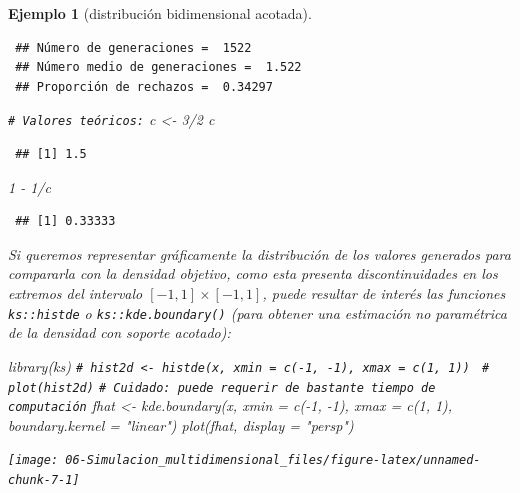 \documentclass[
  10pt,
]{book}
\newenvironment{Shaded}{\begin{snugshade}}{\end{snugshade}}
\newcommand{\AttributeTok}[1]{\textcolor[rgb]{0.77,0.63,0.00}{#1}}
\newcommand{\CommentTok}[1]{\textcolor[rgb]{0.56,0.35,0.01}{\textit{#1}}}
\newcommand{\DecValTok}[1]{\textcolor[rgb]{0.00,0.00,0.81}{#1}}
\newcommand{\FunctionTok}[1]{\textcolor[rgb]{0.00,0.00,0.00}{#1}}
\newcommand{\NormalTok}[1]{#1}
\newcommand{\OtherTok}[1]{\textcolor[rgb]{0.56,0.35,0.01}{#1}}
\newcommand{\SpecialCharTok}[1]{\textcolor[rgb]{0.00,0.00,0.00}{#1}}
\newcommand{\StringTok}[1]{\textcolor[rgb]{0.31,0.60,0.02}{#1}}
\theoremstyle{break}
\newtheorem{example}{Ejemplo}[chapter]
\theoremstyle{nonumberplain}
\renewcommand{\CommentTok}[1]{\textcolor[rgb]{0.41,0.41,0.41}{\texttt{#1}}}
\begin{document}
\begin{example}[distribución bidimensional acotada]
\begin{verbatim}
 ## Número de generaciones =  1522
 ## Número medio de generaciones =  1.522
 ## Proporción de rechazos =  0.34297
\end{verbatim}

\begin{Shaded}
\begin{Highlighting}[]
\CommentTok{\# Valores teóricos:}
\NormalTok{c }\OtherTok{\textless{}{-}} \DecValTok{3}\SpecialCharTok{/}\DecValTok{2}
\NormalTok{c}
\end{Highlighting}
\end{Shaded}

\begin{verbatim}
 ## [1] 1.5
\end{verbatim}

\begin{Shaded}
\begin{Highlighting}[]
\DecValTok{1} \SpecialCharTok{{-}} \DecValTok{1}\SpecialCharTok{/}\NormalTok{c}
\end{Highlighting}
\end{Shaded}

\begin{verbatim}
 ## [1] 0.33333
\end{verbatim}

Si queremos representar gráficamente la distribución de los valores generados
para compararla con la densidad objetivo, como esta presenta discontinuidades
en los extremos del intervalo \([-1, 1] \times [-1, 1]\), puede resultar de interés
las funciones \texttt{ks::histde} o \texttt{ks::kde.boundary()} (para obtener una estimación
no paramétrica de la densidad con soporte acotado):

\begin{Shaded}
\begin{Highlighting}[]
\FunctionTok{library}\NormalTok{(ks)}
\CommentTok{\# hist2d \textless{}{-} histde(x, xmin = c({-}1, {-}1), xmax = c(1, 1))  }
\CommentTok{\# plot(hist2d)}
\CommentTok{\# Cuidado: puede requerir de bastante tiempo de computación}
\NormalTok{fhat }\OtherTok{\textless{}{-}} \FunctionTok{kde.boundary}\NormalTok{(x, }\AttributeTok{xmin =} \FunctionTok{c}\NormalTok{(}\SpecialCharTok{{-}}\DecValTok{1}\NormalTok{, }\SpecialCharTok{{-}}\DecValTok{1}\NormalTok{), }\AttributeTok{xmax =} \FunctionTok{c}\NormalTok{(}\DecValTok{1}\NormalTok{, }\DecValTok{1}\NormalTok{), }\AttributeTok{boundary.kernel =} \StringTok{"linear"}\NormalTok{)  }
\FunctionTok{plot}\NormalTok{(fhat, }\AttributeTok{display =} \StringTok{"persp"}\NormalTok{)}
\end{Highlighting}
\end{Shaded}

\begin{center}\texttt{[image: 06-Simulacion\_multidimensional\_files/figure-latex/unnamed-chunk-7-1]} \end{center}

\end{example}
\end{document}
